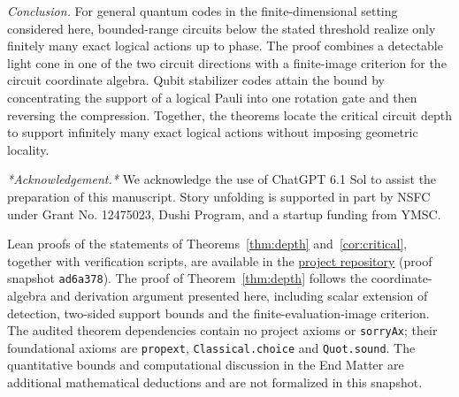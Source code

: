 \documentclass[aps,prl,reprint,notitlepage,nofootinbib,nobibnotes]{revtex4-2}
\begin{document}
\textit{Conclusion.}
For general quantum codes in the finite-dimensional setting considered
here, bounded-range circuits below the stated threshold realize only
finitely many exact logical actions up to phase. The proof combines a
detectable light cone in one of the two circuit directions with a
finite-image criterion for the circuit coordinate algebra.
Qubit stabilizer codes attain the bound by concentrating the support
of a logical Pauli into one rotation gate and then reversing the
compression. Together, the theorems locate the critical circuit depth to support
infinitely many exact logical actions without imposing geometric
locality.

\begin{acknowledgments}
\textit{*Acknowledgement.*} We acknowledge the use of ChatGPT 6.1 Sol to assist the preparation of this manuscript. Story unfolding is supported in part
by NSFC under Grant No. 12475023, Dushi Program, and a startup funding from YMSC.
\end{acknowledgments}

Lean proofs of the statements of Theorems~\ref{thm:depth}
and~\ref{cor:critical}, together with verification scripts, are available
in the \href{https://github.com/Imine20/critical-depth-for-the-infinite-logical-set/tree/ad6a378f6080ba32d92e7c31b6cf71b07685970a}{project repository}
(proof snapshot \texttt{ad6a378}). The proof of
Theorem~\ref{thm:depth} follows the coordinate-algebra and derivation
argument presented here, including scalar extension of detection,
two-sided support bounds and the finite-evaluation-image criterion.
The audited theorem dependencies contain no project axioms or
\texttt{sorryAx}; their foundational axioms are
\texttt{propext}, \texttt{Classical.choice} and \texttt{Quot.sound}.
The quantitative bounds and computational discussion in the End Matter
are additional mathematical deductions and are not formalized in this
snapshot.
\end{document}
